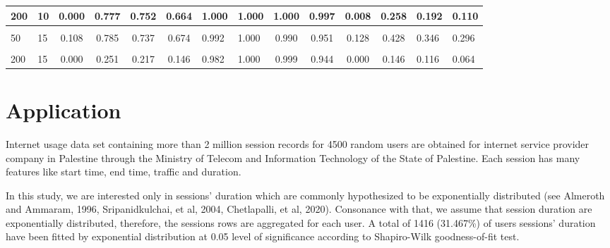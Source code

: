 \documentclass[
]{article}
\begin{document}
\begin{CodeChunk}
\begin{table}[H]
\begin{tabular}[t]{l|l|c|c|c|c|l|l|c|c|c|c|l|l}
\hline
200 & 10 & 0.000 & 0.777 & 0.752 & 0.664 & 1.000 & 1.000 & 1.000 & 0.997 & 0.008 & 0.258 & 0.192 & 0.110\\
\hline
\cellcolor{gray!6}{20} & \cellcolor{gray!6}{15} & \cellcolor{gray!6}{0.743} & \cellcolor{gray!6}{0.937} & \cellcolor{gray!6}{0.908} & \cellcolor{gray!6}{0.868} & \cellcolor{gray!6}{0.994} & \cellcolor{gray!6}{0.994} & \cellcolor{gray!6}{0.968} & \cellcolor{gray!6}{0.920} & \cellcolor{gray!6}{0.514} & \cellcolor{gray!6}{0.770} & \cellcolor{gray!6}{0.720} & \cellcolor{gray!6}{0.700}\\
\hline
50 & 15 & 0.108 & 0.785 & 0.737 & 0.674 & 0.992 & 1.000 & 0.990 & 0.951 & 0.128 & 0.428 & 0.346 & 0.296\\
\hline
\cellcolor{gray!6}{100} & \cellcolor{gray!6}{15} & \cellcolor{gray!6}{0.006} & \cellcolor{gray!6}{0.666} & \cellcolor{gray!6}{0.617} & \cellcolor{gray!6}{0.540} & \cellcolor{gray!6}{0.988} & \cellcolor{gray!6}{0.999} & \cellcolor{gray!6}{0.995} & \cellcolor{gray!6}{0.945} & \cellcolor{gray!6}{0.034} & \cellcolor{gray!6}{0.218} & \cellcolor{gray!6}{0.168} & \cellcolor{gray!6}{0.150}\\
\hline
200 & 15 & 0.000 & 0.251 & 0.217 & 0.146 & 0.982 & 1.000 & 0.999 & 0.944 & 0.000 & 0.146 & 0.116 & 0.064\\
\hline
\end{tabular}
\end{table}

\end{CodeChunk}

\hypertarget{application}{%
\section{Application}\label{application}}

Internet usage data set containing more than 2 million session records
for 4500 random users are obtained for internet service provider company
in Palestine through the Ministry of Telecom and Information Technology
of the State of Palestine. Each session has many features like start
time, end time, traffic and duration.

In this study, we are interested only in sessions' duration which are
commonly hypothesized to be exponentially distributed (see Almeroth and
Ammaram, 1996, Sripanidkulchai, et al, 2004, Chetlapalli, et al, 2020).
Consonance with that, we assume that session duration are exponentially
distributed, therefore, the sessions rows are aggregated for each user.
A total of 1416 (31.467\%) of users sessions' duration have been fitted
by exponential distribution at 0.05 level of significance according to
Shapiro-Wilk goodness-of-fit test.
\end{document}
